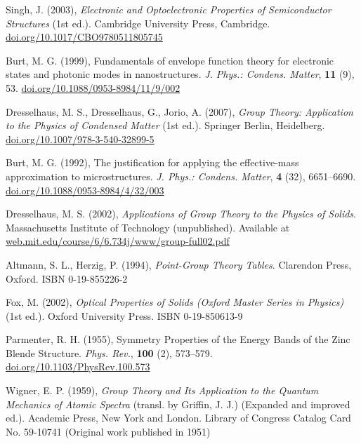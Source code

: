 \documentclass[12pt]{article}
\numberwithin{equation}{section}
\begin{document}
\begin{thebibliography}{10}
Singh, J. (2003), \textit{Electronic and Optoelectronic Properties of Semiconductor Structures} (1st ed.). Cambridge University Press, Cambridge. \href{https://doi.org/10.1017/CBO9780511805745}{doi.org/10.1017/CBO9780511805745}

Burt, M. G. (1999), Fundamentals of envelope function theory for electronic states and photonic modes in nanostructures. \textit{J. Phys.: Condens. Matter}, \textbf{11} (9), 53. \href{https://doi.org/10.1088/0953-8984/11/9/002}{doi.org/10.1088/0953-8984/11/9/002}

Dresselhaus, M. S., Dresselhaus, G., Jorio, A. (2007), \textit{Group Theory: Application to the Physics of Condensed Matter} (1st ed.). Springer Berlin, Heidelberg. \href{https://doi.org/10.1007/978-3-540-32899-5}{doi.org/10.1007/978-3-540-32899-5}

Burt, M. G. (1992), The justification for applying the effective-mass approximation to microstructures. \textit{J. Phys.: Condens. Matter}, \textbf{4} (32), 6651--6690. \href{https://doi.org/10.1088/0953-8984/4/32/003}{doi.org/10.1088/0953-8984/4/32/003}

Dresselhaus, M. S. (2002), \textit{Applications of Group Theory to the Physics of Solids}. Massachusetts Institute of Technology (unpublished). Available at \href{http://web.mit.edu/course/6/6.734j/www/group-full02.pdf}{web.mit.edu/course/6/6.734j/www/group-full02.pdf}

Altmann, S. L., Herzig, P. (1994), \textit{Point-Group Theory Tables}. Clarendon Press, Oxford. ISBN 0-19-855226-2

Fox, M. (2002), \textit{Optical Properties of Solids (Oxford Master Series in Physics)} (1st ed.). Oxford University Press. ISBN 0-19-850613-9

Parmenter, R. H. (1955), Symmetry Properties of the Energy Bands of the Zinc Blende Structure. \textit{Phys. Rev.}, \textbf{100} (2), 573--579. \href{https://doi.org/10.1103/PhysRev.100.573}{doi.org/10.1103/PhysRev.100.573}

Wigner, E. P. (1959), \textit{Group Theory and Its Application to the Quantum Mechanics of Atomic Spectra} (transl. by Griffin, J. J.) (Expanded and improved ed.). Academic Press, New York and London. Library of Congress Catalog Card No. 59-10741 (Original work published in 1951)


\end{thebibliography}
\end{document}
